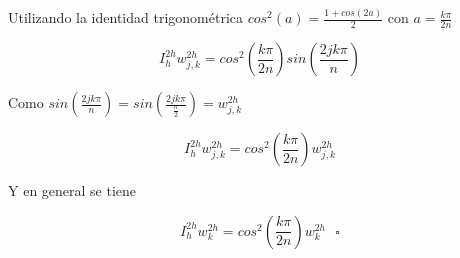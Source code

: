 \documentclass[spanish]{article}
\begin{document}
\begin{enumerate}
        Utilizando la identidad trigonométrica $cos^2(a) = \frac{1 + cos(2a)}{2}$ con $a =\frac{k\pi}{2n}$ 
        
        $$I_h^{2h} w_{j,k}^{2h} = cos^2 \left(\frac{k \pi}{2n}\right) sin\left(\frac{2jk\pi}{n}\right)$$
        
        Como $ sin\left(\frac{2jk\pi}{n}\right) =  sin\left(\frac{2jk\pi}{\frac{n}{2}}\right) = w_{j,k}^{2h}$
        
         $$I_h^{2h} w_{j,k}^{2h} = cos^2 \left(\frac{k \pi}{2n}\right) w_{j,k}^{2h}$$
         
         Y en general se tiene 
         
           $$I_h^{2h} w_{k}^{2h} = cos^2 \left(\frac{k \pi}{2n}\right) w_{k}^{2h} \ \ \ \square$$
  \end{enumerate}
  
\end{document}
